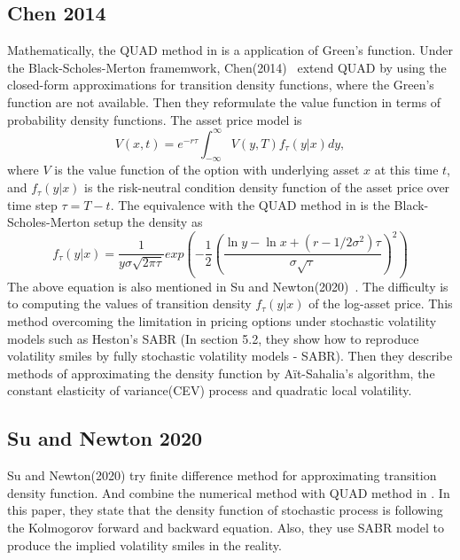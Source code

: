 \documentclass{article}
\numberwithin{equation}{section}
\begin{document}
\subsection*{Chen 2014}
Mathematically, the QUAD method in \cite{Andri_2007} is a application of
Green's function. Under the Black-Scholes-Merton 
framemwork, Chen(2014)~\cite{Chen_2014} extend QUAD by using the closed-form approximations for transition density functions, where 
the Green's function are not available. Then they reformulate the value function in terms of probability density functions.
The asset price model is 
\begin{equation}\label{4}
    V(x,t)=e^{-r \tau} \int_{-\infty}^{\infty} V(y,T)f_\tau(y|x)dy,
\end{equation}
where $V$ is the value function of the option with underlying asset $x$ at this time $t$, and $f_\tau(y|x)$ is the risk-neutral 
condition density function of the asset price over time step $\tau =T-t$. The equivalence with the QUAD method in \cite{Andri_2003} is 
the Black-Scholes-Merton setup the density as 
\begin{equation}\label{5}
    f_\tau(y|x)=\frac{1}{y\sigma \sqrt{2\pi \tau}}exp\left(-\frac{1}{2}\left(\frac{\ln y - \ln x + (r-1/2 \sigma^2) \tau}{\sigma \sqrt{\tau}}\right)^2\right)
\end{equation}
The above equation is also mentioned in Su and Newton(2020)~\cite{Su_2020}. The difficulty is to computing the values of transition density $f_\tau (y|x)$ of 
the log-asset price. This method overcoming the limitation in pricing options under stochastic volatility models such as Heston's SABR (In section 5.2, they 
show how to reproduce volatility smiles by fully stochastic volatility 
models - SABR). Then they describe methods of approximating the density function by A\"{i}t-Sahalia's algorithm, the constant elasticity of variance(CEV) 
process and quadratic local volatility.

\subsection*{Su and Newton 2020}
Su and Newton(2020)\cite{Su_2020} try finite difference method for approximating transition density function. And combine the numerical method with QUAD method in \cite{Chen_2014}.
In this paper, they state that the density function of stochastic process is following the Kolmogorov forward and backward equation. Also, they use SABR model to produce the 
implied volatility smiles in the reality. 
\end{document}
